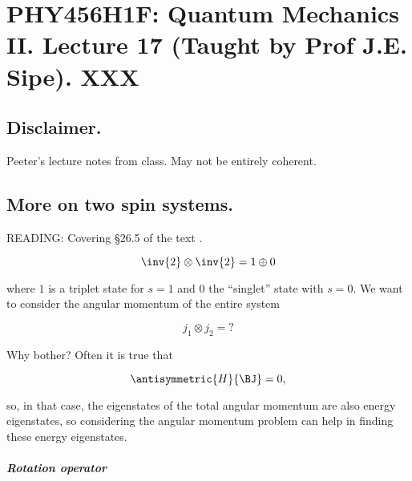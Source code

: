 
%

\chapter{PHY456H1F: Quantum Mechanics II.  Lecture 17 (Taught by Prof J.E. Sipe).  XXX}
\label{chap:qmTwoL17}
{}
\date{Nov 9, 2011}

\beginArtWithToc

\section{Disclaimer.}

Peeter's lecture notes from class.  May not be entirely coherent.

\section{More on two spin systems.}

READING: Covering \S 26.5 of the text \cite{desai2009quantum}.

\begin{equation}\label{eqn:qmTwoL17:n}
\inv{2} \otimes \inv{2} = 1 \oplus 0
\end{equation}

where $1$ is a triplet state for $s=1$ and $0$ the ``singlet'' state with $s=0$.  We want to consider the angular momentum of the entire system

\begin{equation}\label{eqn:qmTwoL17:n}
j_1 \otimes j_2 = ?
\end{equation}

Why bother?  Often it is true that 

\begin{equation}\label{eqn:qmTwoL17:n}
\antisymmetric{H}{\BJ} = 0,
\end{equation}

so, in that case, the eigenstates of the total angular momentum are also energy eigenstates, so considering the angular momentum problem can help in finding these energy eigenstates.

\paragraph{Rotation operator}

